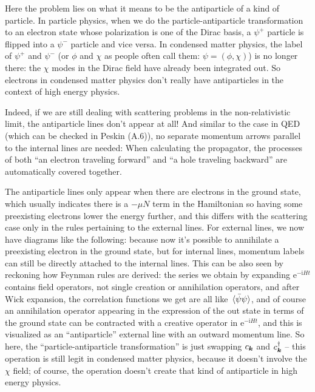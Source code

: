 \documentclass[hyperref, a4paper, 12pt]{report}
\newcommand*{\ii}{\mathrm{i}}
\newcommand*{\ee}{\mathrm{e}}
\begin{document}
Here the problem lies on what it means to be the antiparticle of a kind of particle.
In particle physics,
when we do the particle-antiparticle transformation to an electron state 
whose polarization is one of the Dirac basis,
a $\psi^+$ particle is flipped into a $\psi^-$ particle and vice versa.
In condensed matter physics, the label of $\psi^+$ and $\psi^-$
(or $\phi$ and $\chi$ as people often call them:
$\psi = (\phi, \chi)$) is no longer there:
the $\chi$ modes in the Dirac field have already been integrated out.
So electrons in condensed matter physics don't really have antiparticles 
in the context of high energy physics.

Indeed, if we are still dealing with scattering problems in the non-relativistic limit,
the antiparticle lines don't appear at all!
And similar to the case in QED (which can be checked in Peskin (A.6)), 
no separate momentum arrows parallel to the internal lines are needed:
When calculating the propagator, 
the processes of both ``an electron traveling forward'' and ``a hole traveling backward''
are automatically covered together.

The antiparticle lines only appear when there are electrons in the ground state,
which usually indicates there is a $-\mu N$ term in the Hamiltonian
so having some preexisting electrons lower the energy further,
and this differs with the scattering case only in the rules pertaining to the external lines.
For external lines, we now have diagrams like the following:
%
because now it's possible to annihilate a preexisting electron in the ground state,
but for internal lines, momentum labels can still be directly attached to the internal lines.
This can be also seen by reckoning how Feynman rules are derived:
the series we obtain by expanding $\ee^{- \ii H t}$ 
contains field operators, not single creation or annihilation operators,
and after Wick expansion,
the correlation functions we get are all like $\expval*{\bar{\psi} \psi}$,
and of course an annihilation operator appearing 
in the expression of the out state in terms of the ground state 
can be contracted with a creative operator in $\ee^{- \ii H t}$,
and this is visualized as an ``antiparticle'' external line 
with an outward momentum line.
So here, the ``particle-antiparticle transformation''
is just swapping $c_{\vb*{k}}$ and $c_{\vb*{k}}^\dagger$
-- this operation is still legit in condensed matter physics,
because it doesn't involve the $\chi$ field;
of course, the operation doesn't create that kind of antiparticle in high energy physics.
\end{document}
